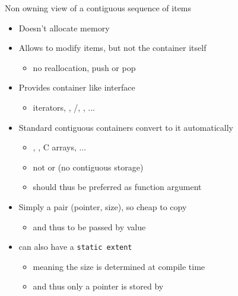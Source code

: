 \begin{frame}[fragile]
  \begin{block}{Non owning view of a contiguous sequence of items}
    \begin{itemize}
    \item Doesn't allocate memory
    \item Allows to modify items, but not the container itself
      \begin{itemize}
      \item no reallocation, push or pop
      \end{itemize}
    \item Provides container like interface
      \begin{itemize}
      \item iterators, , /, , ...
      \end{itemize}
    \item Standard contiguous containers convert to it automatically
      \begin{itemize}
      \item {}, , C arrays, ...
      \item not  or  (no contiguous storage)
      \item {} should thus be preferred as function argument
      \end{itemize}
    \item Simply a pair (pointer, size), so cheap to copy
      \begin{itemize}
      \item and thus to be passed by value
      \end{itemize}
    \item {} can also have a \texttt{static extent}
      \begin{itemize}
      \item meaning the size is determined at compile time
      \item and thus only a pointer is stored by 
      \end{itemize}
    \end{itemize}
  \end{block}
\end{frame}

